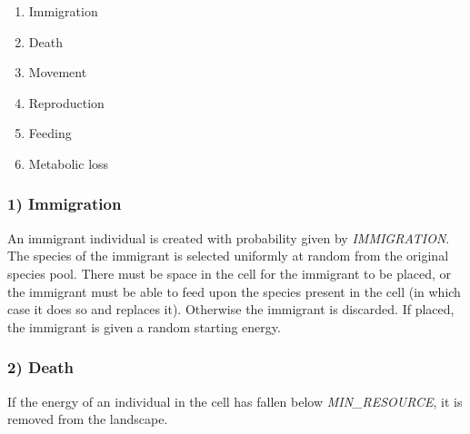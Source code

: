 \begin{enumerate}
	\item Immigration
	\item Death
	\item Movement
	\item Reproduction
	\item Feeding
	\item Metabolic loss
\end{enumerate}

\subsubsection*{1) Immigration}
An immigrant individual is created with probability given by \emph{IMMIGRATION}. The species of the immigrant is selected uniformly at random from the original species pool. There must be space in the cell for the immigrant to be placed, or the immigrant must be able to feed upon the species present in the cell (in which case it does so and replaces it). Otherwise the immigrant is discarded. If placed, the immigrant is given a random starting energy.  
\subsubsection*{2) Death}
If the energy of an individual in the cell has fallen below \emph{MIN\_RESOURCE}, it is removed from the landscape.

